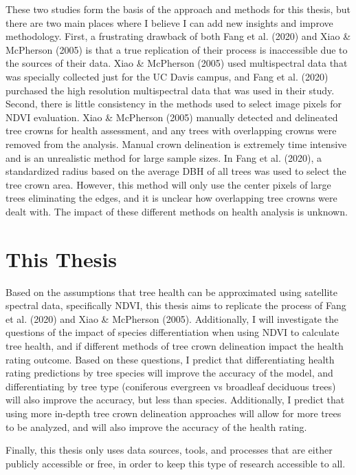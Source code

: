 \documentclass[12pt,twoside]{reedthesis}
\begin{document}
These two studies form the basis of the approach and methods for this thesis, but there are two main places where I believe I can add new insights and improve methodology. First, a frustrating drawback of both Fang et al. (2020) and Xiao \& McPherson (2005) is that a true replication of their process is inaccessible due to the sources of their data. Xiao \& McPherson (2005) used multispectral data that was specially collected just for the UC Davis campus, and Fang et al. (2020) purchased the high resolution multispectral data that was used in their study. Second, there is little consistency in the methods used to select image pixels for NDVI evaluation. Xiao \& McPherson (2005) manually detected and delineated tree crowns for health assessment, and any trees with overlapping crowns were removed from the analysis. Manual crown delineation is extremely time intensive and is an unrealistic method for large sample sizes. In Fang et al. (2020), a standardized radius based on the average DBH of all trees was used to select the tree crown area. However, this method will only use the center pixels of large trees eliminating the edges, and it is unclear how overlapping tree crowns were dealt with. The impact of these different methods on health analysis is unknown.

\hypertarget{this-thesis}{%
\section{This Thesis}\label{this-thesis}}

Based on the assumptions that tree health can be approximated using satellite spectral data, specifically NDVI, this thesis aims to replicate the process of Fang et al. (2020) and Xiao \& McPherson (2005). Additionally, I will investigate the questions of the impact of species differentiation when using NDVI to calculate tree health, and if different methods of tree crown delineation impact the health rating outcome. Based on these questions, I predict that differentiating health rating predictions by tree species will improve the accuracy of the model, and differentiating by tree type (coniferous evergreen vs broadleaf deciduous trees) will also improve the accuracy, but less than species. Additionally, I predict that using more in-depth tree crown delineation approaches will allow for more trees to be analyzed, and will also improve the accuracy of the health rating.

Finally, this thesis only uses data sources, tools, and processes that are either publicly accessible or free, in order to keep this type of research accessible to all.
\end{document}

